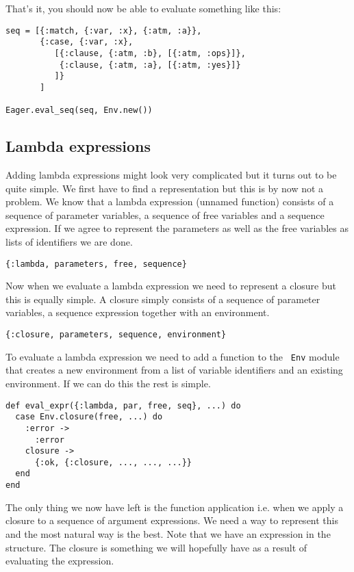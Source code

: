 \documentclass[a4paper,11pt]{article}
\begin{document}
That's it, you should now be able to evaluate something like this:

\begin{verbatim}
seq = [{:match, {:var, :x}, {:atm, :a}},
       {:case, {:var, :x},
          [{:clause, {:atm, :b}, [{:atm, :ops}]},
           {:clause, {:atm, :a}, [{:atm, :yes}]}
          ]}
       ]

Eager.eval_seq(seq, Env.new())
\end{verbatim}

\subsection{Lambda expressions}

Adding lambda expressions might look very complicated but it turns out
to be quite simple. We first have to find a representation but this is
by now not a problem. We know that a lambda expression (unnamed
function) consists of a sequence of parameter variables, a sequence of
free variables and a sequence expression. If we agree to represent the
parameters as well as the free variables as lists of identifiers we
are done.

\begin{verbatim}
{:lambda, parameters, free, sequence}
\end{verbatim}

Now when we evaluate a lambda expression we need to represent a
closure but this is equally simple. A closure simply consists of a
sequence of parameter variables, a sequence expression together with an
environment.

\begin{verbatim}
{:closure, parameters, sequence, environment}
\end{verbatim}

To evaluate a lambda expression we need to add a function to the {\tt
  Env} module that creates a new environment from a list of variable
identifiers and an existing environment. If we can do this the rest is
simple.

\begin{verbatim}
def eval_expr({:lambda, par, free, seq}, ...) do
  case Env.closure(free, ...) do
    :error ->
      :error
    closure ->
      {:ok, {:closure, ..., ..., ...}}
  end
end
\end{verbatim}

The only thing we now have left is the function application i.e. when we
apply a closure to a sequence of argument expressions. We need a way
to represent this and the most natural way is the best. Note that we
have an expression in the structure. The closure is something we will
hopefully have as a result of evaluating the expression.
\end{document}
